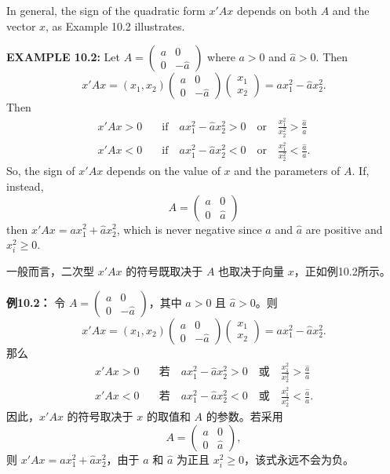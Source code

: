 \begin{original}
In general, the sign of the quadratic form $x'Ax$ depends on both $A$ and the vector $x$, as Example 10.2 illustrates.

\textbf{EXAMPLE 10.2:} Let $A = \begin{pmatrix} a & 0 \\ 0 & -\hat{a} \end{pmatrix}$ where $a > 0$ and $\hat{a} > 0$. Then
\[
x'Ax = (x_1, x_2) \begin{pmatrix} a & 0 \\ 0 & -\hat{a} \end{pmatrix} \begin{pmatrix} x_1 \\ x_2 \end{pmatrix} = a x_1^2 - \hat{a} x_2^2.
\]
Then
\begin{align*}
x'Ax > 0 &\quad\text{if}\quad a x_1^2 - \hat{a} x_2^2 > 0 \quad\text{or}\quad \frac{x_1^2}{x_2^2} > \frac{\hat{a}}{a} \\
x'Ax < 0 &\quad\text{if}\quad a x_1^2 - \hat{a} x_2^2 < 0 \quad\text{or}\quad \frac{x_1^2}{x_2^2} < \frac{\hat{a}}{a}.
\end{align*}
So, the sign of $x'Ax$ depends on the value of $x$ and the parameters of $A$. If, instead,
\[
A = \begin{pmatrix} a & 0 \\ 0 & \hat{a} \end{pmatrix}
\]
then $x'Ax = a x_1^2 + \hat{a} x_2^2$, which is never negative since $a$ and $\hat{a}$ are positive and $x_i^2 \geq 0$.
\end{original}
\begin{translation}
一般而言，二次型 $x'Ax$ 的符号既取决于 $A$ 也取决于向量 $x$，正如例10.2所示。

\textbf{例10.2：} 令 $A = \begin{pmatrix} a & 0 \\ 0 & -\hat{a} \end{pmatrix}$，其中 $a > 0$ 且 $\hat{a} > 0$。则
\[
x'Ax = (x_1, x_2) \begin{pmatrix} a & 0 \\ 0 & -\hat{a} \end{pmatrix} \begin{pmatrix} x_1 \\ x_2 \end{pmatrix} = a x_1^2 - \hat{a} x_2^2.
\]
那么
\begin{align*}
x'Ax > 0 &\quad\text{若}\quad a x_1^2 - \hat{a} x_2^2 > 0 \quad\text{或}\quad \frac{x_1^2}{x_2^2} > \frac{\hat{a}}{a} \\
x'Ax < 0 &\quad\text{若}\quad a x_1^2 - \hat{a} x_2^2 < 0 \quad\text{或}\quad \frac{x_1^2}{x_2^2} < \frac{\hat{a}}{a}.
\end{align*}
因此，$x'Ax$ 的符号取决于 $x$ 的取值和 $A$ 的参数。若采用
\[
A = \begin{pmatrix} a & 0 \\ 0 & \hat{a} \end{pmatrix},
\]
则 $x'Ax = a x_1^2 + \hat{a} x_2^2$，由于 $a$ 和 $\hat{a}$ 为正且 $x_i^2 \geq 0$，该式永远不会为负。
\end{translation}

